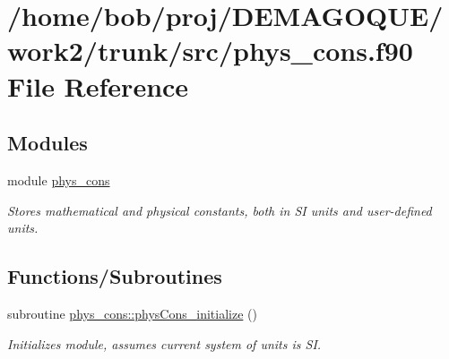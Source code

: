 \hypertarget{phys__cons_8f90}{
\section{/home/bob/proj/DEMAGOQUE/work2/trunk/src/phys\_\-cons.f90 File Reference}
\label{phys__cons_8f90}
}
\subsection*{Modules}
\begin{DoxyCompactItemize}
\item 
module \hyperlink{namespacephys__cons}{phys\_\-cons}


\begin{DoxyCompactList}\small\item\em Stores mathematical and physical constants, both in SI units and user-\/defined units. \item\end{DoxyCompactList}

\end{DoxyCompactItemize}
\subsection*{Functions/Subroutines}
\begin{DoxyCompactItemize}
\item 
subroutine \hyperlink{namespacephys__cons_a8ef21bd0854146018406be9f1aee9921}{phys\_\-cons::physCons\_\-initialize} ()
\begin{DoxyCompactList}\small\item\em Initializes module, assumes current system of units is SI. \item\end{DoxyCompactList}\end{DoxyCompactItemize}
